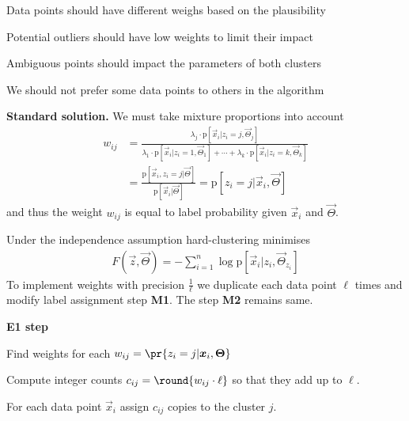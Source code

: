\documentclass[landscape,footrule]{foils}
\newcommand{\pd}[1]{\mathrm{p}[#1]}
\begin{document}

Data points should have different weighs based on the plausibility 
\begin{triangles}
\item Potential outliers should have low weights to limit their impact
\item Ambiguous points should impact the parameters of both clusters 
\item We should not prefer some data points to others in the algorithm
\end{triangles} 
\vspace*{1cm}

\textbf{Standard solution.}
We must take mixture proportions into account
\begin{align*}
w_{ij}&=\frac{\lambda_j\cdot\pd{\vec{x}_i|z_i=j,\vec{\Theta}_j}}{\lambda_1\cdot\pd{\vec{x}_i|z_i=1,\vec{\Theta}_1}+\cdots+\lambda_k\cdot\pd{\vec{x}_i|z_i=k,\vec{\Theta}_k}}\\
  &=\frac{\pd{\vec{x}_i,z_i=j|\vec{\Theta}}}{\pd{\vec{x}_i|\vec{\Theta}}}
  =\pd{z_i=j|\vec{x}_i,\vec{\Theta}}
\end{align*}
and thus the weight $w_{ij}$ is equal to label probability given $\vec{x}_i$ and $\vec{\Theta}$.\vspace*{-0.5cm}



Under the independence assumption hard-clustering minimises 
\begin{align*}
F(\vec{z},\vec{\Theta}) =- \sum_{i=1}^n \log\pd{\vec{x}_i|z_i,\vec{\Theta}_{z_i}}
\end{align*}
To implement weights with precision $\frac{1}{\ell}$ we duplicate each data point $\ell$ times and modify label assignment step \textbf{M1}. The step \textbf{M2} remains same.  
\vspace*{1cm}

\textbf{E1 step} 
\begin{triangles}
\item Find weights for each $w_{ij}=\pr{z_i=j|\vec{x}_i,\vec{\Theta}}$
\item Compute integer counts $c_{ij}=\round{w_{ij}\cdot \ell}$ so that they add up to $\ell$.
\item For each data point $\vec{x}_i$ assign $c_{ij}$ copies to the cluster $j$.   
\end{triangles}
\end{document}
